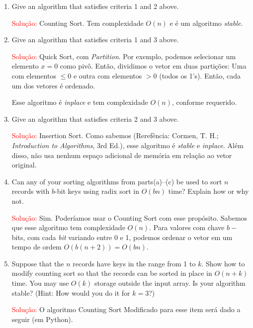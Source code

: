 \documentclass{article}
\begin{document}
\begin{enumerate}[label=(\alph*)]
  \item Give an algorithm that satisfies criteria 1 and 2 above.
  
  \textcolor{red}{Solução: }
    Counting Sort. Tem complexidade $O(n)$ e é um algoritmo \textit{stable}.
    
  \item Give an algorithm that satisfies criteria 1 and 3 above.
    
    \textcolor{red}{Solução: }
    Quick Sort, com \textit{Partition}. Por exemplo, podemos selecionar um elemento $x=0$ como pivô. Então, dividimos o vetor em duas partições: Uma com elementos $\leq 0$ e outra com elementos $>0$ (todos os 1's). Então, cada um dos vetores é ordenado. 
    
    Esse algoritmo é \textit{inplace} e tem complexidade $O(n)$, conforme requerido.
  
  \item Give an algorithm that satisfies criteria 2 and 3 above.
  
    \textcolor{red}{Solução: }
    Insertion Sort. Como sabemos (Rerefência: Cormen, T. H.; \textit{Introduction to Algorithms}, 3rd Ed.), esse algoritmo é \textit{stable} e \textit{inplace}. Além disso, não usa nenhum espaço adicional de memória em relação ao vetor original.
    
  \item Can any of your sorting algorithms from parts(a)–(c) be used to sort $n$ records with $b$-bit keys using radix sort in $O(bn)$ time? Explain how or why not.
  
    \textcolor{red}{Solução: }
    Sim. Poderíamos usar o Counting Sort com esse propósito. Sabemos que esse algoritmo tem complexidade $O(n)$. Para valores com chave $b-$bits, com cada \textit{bit} variando entre 0 e 1, podemos ordenar o vetor em um tempo de ordem $O(b(n+2)) = O(bn)$.  

    
  \item Suppose that the $n$ records have keys in the range from 1 to $k$. Show how to modify counting sort so that the records can be sorted in place in $O(n + k)$ time. You may use $O(k)$ storage outside the input array. Is your algorithm stable? (Hint: How would you do it for $k = 3$?)
  \vspace{\baselineskip}
  
  \textcolor{red}{Solução: } O algoritmo Counting Sort Modificado para esse item será dado a seguir (em Python). 
  

\end{enumerate}
\end{document}
